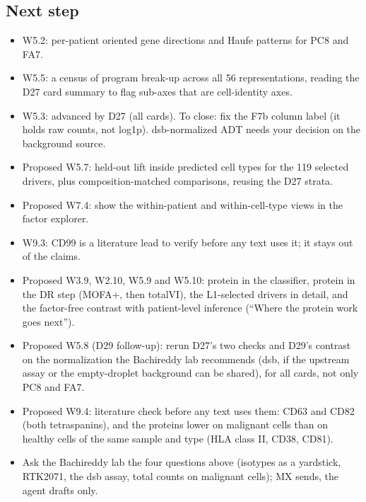 \subsection*{Next step}
\begin{itemize}[itemsep=0pt,topsep=0pt]
\item W5.2: per-patient oriented gene directions and Haufe patterns for PC8 and FA7.
\item W5.5: a census of program break-up across all 56 representations, reading the D27 card summary to flag sub-axes that are cell-identity axes.
\item W5.3: advanced by D27 (all cards). To close: fix the F7b column label (it holds raw counts, not log1p). dsb-normalized ADT needs your decision on the background source.
\item Proposed W5.7: held-out lift inside predicted cell types for the 119 selected drivers, plus composition-matched comparisons, reusing the D27 strata.
\item Proposed W7.4: show the within-patient and within-cell-type views in the factor explorer.
\item W9.3: CD99 is a literature lead to verify before any text uses it; it stays out of the claims.
\item Proposed W3.9, W2.10, W5.9 and W5.10: protein in the classifier, protein in the DR step (MOFA+, then totalVI), the L1-selected drivers in detail, and the factor-free contrast with patient-level inference (``Where the protein work goes next'').
\item Proposed W5.8 (D29 follow-up): rerun D27's two checks and D29's contrast on the normalization the Bachireddy lab recommends (dsb, if the upstream assay or the empty-droplet background can be shared), for all cards, not only PC8 and FA7.
\item Proposed W9.4: literature check before any text uses them: CD63 and CD82 (both tetraspanins), and the proteins lower on malignant cells than on healthy cells of the same sample and type (HLA class II, CD38, CD81).
\item Ask the Bachireddy lab the four questions above (isotypes as a yardstick, RTK2071, the dsb assay, total counts on malignant cells); MX sends, the agent drafts only.
\end{itemize}

